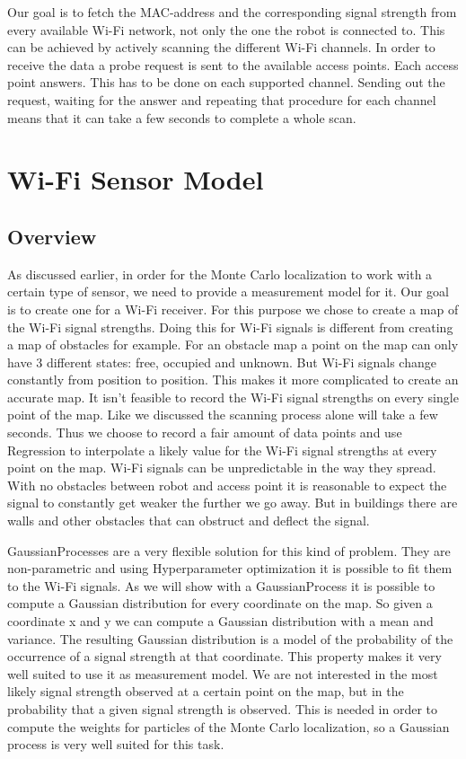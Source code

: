 Our goal is to fetch the MAC-address and the corresponding signal strength from every available Wi-Fi network, not only the one the robot is connected to. This can be achieved by actively scanning the different Wi-Fi channels. In order to receive the data a probe request is sent to the available access points. Each access point answers. This has to be done on each supported channel. Sending out the request, waiting for the answer and repeating that procedure for each channel means that it can take a few seconds to complete a whole scan. 

\section{Wi-Fi Sensor Model} \label{sec:gp}
\subsection{Overview}
As discussed earlier, in order for the Monte Carlo localization to work with a certain type of sensor, we need to provide a measurement model for it. Our goal is to create one for a Wi-Fi receiver. For this purpose we chose to create a map of the Wi-Fi signal strengths. Doing this for Wi-Fi signals is different from creating a map of obstacles for example. For an obstacle map a point on the map can only have 3 different states: free, occupied and unknown. But Wi-Fi signals change constantly from position to position. This makes it more complicated to create an accurate map. It isn't feasible to record the Wi-Fi signal strengths on every single point of the map. Like we discussed the scanning process alone will take a few seconds. Thus we choose to record a fair amount of data points and use \gls{Regression} to interpolate a likely value for the Wi-Fi signal strengths at every point on the map. Wi-Fi signals can be unpredictable in the way they spread. With no obstacles between robot and access point it is reasonable to expect the signal to constantly get weaker the further we go away. But in buildings there are walls and other obstacles that can obstruct and deflect the signal.

\Gls{GaussianProcess}es are a very flexible solution for this kind of problem. They are non-parametric and using \gls{Hyperparameter} optimization it is possible to fit them to the Wi-Fi signals. As we will show with a \Gls{GaussianProcess} it is possible to compute a Gaussian distribution for every coordinate on the map. So given a coordinate x and y we can compute a Gaussian distribution with a mean and variance. The resulting Gaussian distribution is a model of the probability of the occurrence of a signal strength at that coordinate. This property makes it very well suited to use it as measurement model. We are not interested in the most likely signal strength observed at a certain point on the map, but in the probability that a given signal strength is observed. This is needed in order to compute the weights for particles of the Monte Carlo localization, so a Gaussian process is very well suited for this task.

